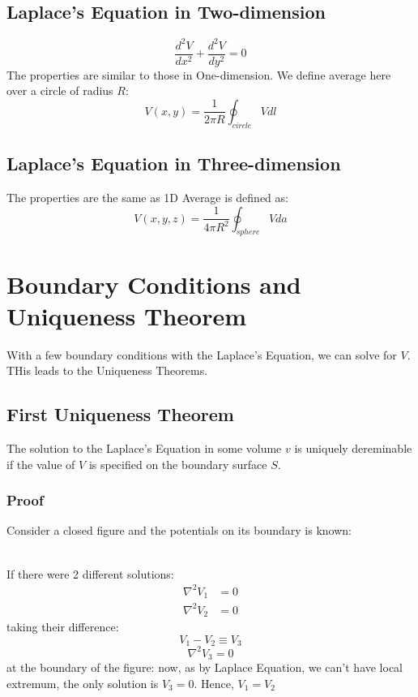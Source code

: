 \documentclass{article}
\begin{document}
\subsection{Laplace's Equation in Two-dimension}
\[ \frac{d^2 V}{dx^2} + \frac{d^2 V}{dy^2} = 0\]
The properties are similar to those in One-dimension.
We define average here over a circle of radius $R$:
\[ V(x,y) = \frac{1}{2 \pi R} \oint_{circle} V dl\]
\subsection{Laplace's Equation in Three-dimension}
The properties are the same as 1D
Average is defined as:
\[ V(x,y,z) = \frac{1}{4 \pi R^2} \oint_{sphere} V da\]

\section{Boundary Conditions and Uniqueness Theorem}
With a few boundary conditions with the Laplace's Equation, we can solve for $V$. THis leads to the Uniqueness Theorems.

\subsection{First Uniqueness Theorem}
The solution to the Laplace's Equation in some volume $v$ is uniquely dereminable if the value of $V$ is specified on the boundary surface $S$.
\subsubsection*{Proof}
Consider a closed figure and the potentials on its boundary is known:\\

\\
If there were 2 different solutions:\\
\begin{align*}
    \nabla^2 V_1 &= 0\\
    \nabla^2 V_2 &= 0
\end{align*}
taking their difference:
\[ V_1 - V_2 \equiv V_3 \]
\[ \nabla^2 V_3 = 0 \]
at the boundary of the figure:
now, as by Laplace Equation, we can't have local extremum, the only solution is \(V_3 = 0\).
Hence, \(V_1 = V_2\)
\end{document}
